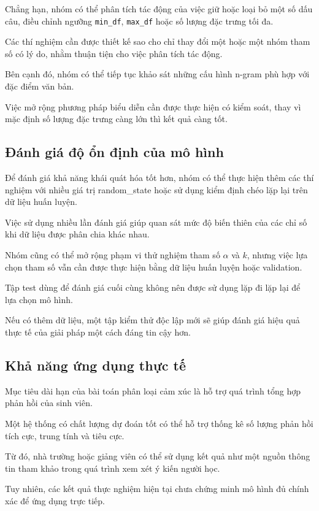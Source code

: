 Chẳng hạn, nhóm có thể phân tích
tác động của việc giữ hoặc loại
bỏ một số dấu câu, điều chỉnh
ngưỡng \texttt{min\_df},
\texttt{max\_df} hoặc số lượng
đặc trưng tối đa.

Các thí nghiệm cần được thiết
kế sao cho chỉ thay đổi một
hoặc một nhóm tham số có
lý do, nhằm thuận tiện cho
việc phân tích tác động.

Bên cạnh đó, nhóm có thể
tiếp tục khảo sát những
cấu hình n-gram phù hợp
với đặc điểm văn bản.

Việc mở rộng phương pháp
biểu diễn cần được thực
hiện có kiểm soát, thay vì
mặc định số lượng đặc
trưng càng lớn thì kết
quả càng tốt.


\subsection{Đánh giá độ ổn định của mô hình}

Để đánh giá khả năng khái
quát hóa tốt hơn, nhóm
có thể thực hiện thêm các
thí nghiệm với nhiều
giá trị random_state
hoặc sử dụng kiểm định
chéo lặp lại trên dữ liệu
huấn luyện.

Việc sử dụng nhiều lần
đánh giá giúp quan sát
mức độ biến thiên của
các chỉ số khi dữ liệu
được phân chia khác nhau.

Nhóm cũng có thể mở rộng
phạm vi thử nghiệm tham
số $\alpha$ và $k$,
nhưng việc lựa chọn
tham số vẫn cần được
thực hiện bằng dữ liệu
huấn luyện hoặc validation.

Tập test dùng để đánh
giá cuối cùng không
nên được sử dụng lặp
đi lặp lại để lựa
chọn mô hình.

Nếu có thêm dữ liệu,
một tập kiểm thử độc
lập mới sẽ giúp đánh
giá hiệu quả thực tế
của giải pháp một
cách đáng tin cậy hơn.


\subsection{Khả năng ứng dụng thực tế}

Mục tiêu dài hạn của
bài toán phân loại cảm
xúc là hỗ trợ quá trình
tổng hợp phản hồi
của sinh viên.

Một hệ thống có chất
lượng dự đoán tốt có
thể hỗ trợ thống kê
số lượng phản hồi
tích cực, trung tính
và tiêu cực.

Từ đó, nhà trường
hoặc giảng viên có
thể sử dụng kết quả
như một nguồn thông
tin tham khảo trong
quá trình xem xét
ý kiến người học.

Tuy nhiên, các kết
quả thực nghiệm hiện
tại chưa chứng minh
mô hình đủ chính xác
để ứng dụng trực tiếp.

